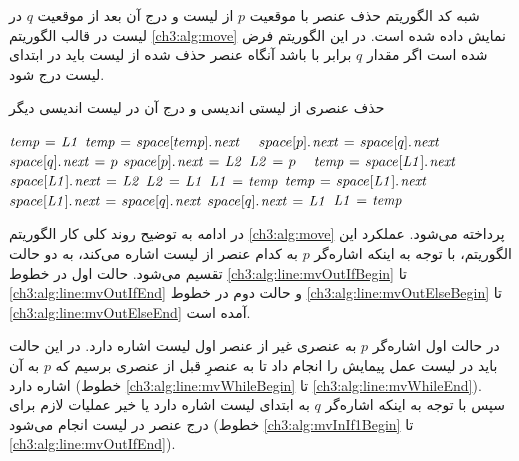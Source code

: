 شبه کد الگوریتم حذف عنصر با موقعیت {$p$} از لیست {} و درج آن بعد از موقعیت {$q$} در لیست {} در قالب الگوریتم {\eqref{ch3:alg:move}} نمایش داده شده است. در این الگوریتم فرض شده است اگر مقدار {$q$} برابر با {} باشد آنگاه عنصر حذف شده از لیست {} باید در ابتدای لیست {} درج شود.
\begin{algorithm}
\caption{حذف عنصری از لیستی اندیسی و درج آن در لیست اندیسی دیگر}\label{ch3:alg:move}
\begin{latin}
\begin{algorithmic}[1]
		\label{ch3:alg:line:mvOutIfBegin}
				\State	$\mathit{temp} \mathrel{\hspace{1pt}=\hspace{1pt}} \mathit{L1}$
				\label{ch3:alg:line:mvWhileBegin}
						\State	$\mathit{temp} \mathrel{\hspace{1pt}=\hspace{1pt}} space[temp].\hspace*{1pt}\mathit{next}$
				\EndWhile\ \label{ch3:alg:line:mvWhileEnd}
				\label{ch3:alg:mvInIf1Begin}
						\State	$space[p].\hspace*{1pt}\mathit{next} \mathrel{\hspace{1pt}=\hspace{1pt}} space[q].\hspace*{1pt}\mathit{next}$
						\State	$space[q].\hspace*{1pt}\mathit{next} \mathrel{\hspace{1pt}=\hspace{1pt}} p$
				\Else
						\State	$space[p].\hspace*{1pt}\mathit{next} \mathrel{\hspace{1pt}=\hspace{1pt}} \mathit{L2}$
						\State	$\mathit{L2} \mathrel{\hspace{1pt}=\hspace{1pt}} p$
				\EndIf\ \label{ch3:alg:line:mvOutIfEnd}
		\Else
				\label{ch3:alg:line:mvOutElseBegin}
						\State	$\mathit{temp} \mathrel{\hspace{1pt}=\hspace{1pt}} space[\mathit{L1}].\hspace*{1pt}\mathit{next}$
						\State	$space[\mathit{L1}].\hspace*{1pt}\mathit{next} \mathrel{\hspace{1pt}=\hspace{1pt}} \mathit{L2}$
						\State	$\mathit{L2} \mathrel{\hspace{1pt}=\hspace{1pt}} \mathit{L1}$
						\State	$\mathit{L1} \mathrel{\hspace{1pt}=\hspace{1pt}} \mathit{temp}$
				\Else
						\State	$\mathit{temp} \mathrel{\hspace{1pt}=\hspace{1pt}} space[\mathit{L1}].\hspace*{1pt}\mathit{next}$
						\State	$space[\mathit{L1}].\hspace*{1pt}\mathit{next} \mathrel{\hspace{1pt}=\hspace{1pt}} space[q].\hspace*{1pt}\mathit{next}$
						\State	$space[q].\hspace*{1pt}\mathit{next} \mathrel{\hspace{1pt}=\hspace{1pt}} \mathit{L1}$
						\State	$\mathit{L1} \mathrel{\hspace{1pt}=\hspace{1pt}} \mathit{temp}$
				\EndIf
		\EndIf\ \label{ch3:alg:line:mvOutElseEnd}
\EndProcedure
\end{algorithmic}
\end{latin}
\end{algorithm}

در ادامه به توضیح روند کلی کار الگوریتم {\eqref{ch3:alg:move}} پرداخته می‌شود. عملکرد این الگوریتم، با توجه به اینکه اشاره‌گر {$p$} به کدام عنصر از لیست {} اشاره می‌کند، به دو حالت تقسیم می‌شود. حالت اول در خطوط {\ref{ch3:alg:line:mvOutIfBegin}} تا {\ref{ch3:alg:line:mvOutIfEnd}} و حالت دوم در خطوط {\ref{ch3:alg:line:mvOutElseBegin}} تا {\ref{ch3:alg:line:mvOutElseEnd}} آمده است.

در حالت اول اشاره‌گر {$p$} به عنصری غیر از عنصر اول لیست {} اشاره دارد. در این حالت باید در لیست {} عمل پیمایش را انجام داد تا به عنصرِ قبل از عنصری برسیم که {$p$} به آن اشاره دارد (خطوط {\ref{ch3:alg:line:mvWhileBegin}} تا {\ref{ch3:alg:line:mvWhileEnd}}). سپس با توجه به اینکه اشاره‌گر {$q$} به ابتدای لیست {} اشاره دارد یا خیر عملیات لازم برای درج عنصر در لیست {} انجام می‌شود (خطوط {\ref{ch3:alg:mvInIf1Begin}} تا {\ref{ch3:alg:line:mvOutIfEnd}}).


